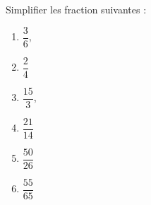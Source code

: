 
\begin{exercice}\label{exosmath-0910}

    Simplifier les fraction suivantes :
    \begin{multicols}{2}
        \begin{enumerate}
            \item
                \( \dfrac{ 3 }{ 6 }\),
            \item
                \( \dfrac{ 2 }{ 4 }\)
            \item
                \( \dfrac{ 15 }{ 3 }\),
            \item
                \( \dfrac{ 21 }{ 14 }\)
            \item
                \( \dfrac{ 50 }{ 26 }\)
            \item
                \( \dfrac{ 55 }{ 65 }\)
        \end{enumerate}
    \end{multicols}

\end{exercice}

